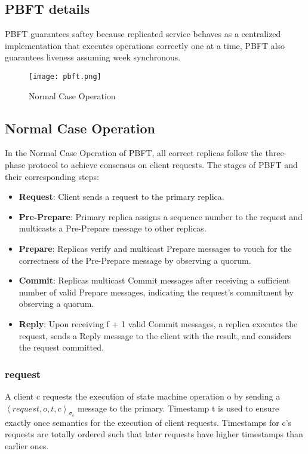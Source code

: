 \documentclass{article}
\begin{document}
\subsection{PBFT details}
PBFT guarantees saftey because replicated service behaves as a centralized implementation that executes operations correctly one at a time, PBFT also guarantees liveness assuming week synchronous.
\begin{figure}[t]
\texttt{[image: pbft.png]}
\centering
\caption{Normal Case Operation}
\end{figure}
\subsection{Normal Case Operation}
In the Normal Case Operation of PBFT, all correct replicas follow the three-phase protocol to achieve consensus on client requests.
The stages of PBFT and their corresponding steps:
\begin{itemize}
    \item \textbf{Request}: Client sends a request to the primary replica.
    \item \textbf{Pre-Prepare}: Primary replica assigns a sequence number to the request and multicasts a Pre-Prepare message to other replicas.
    \item \textbf{Prepare}: Replicas verify and multicast Prepare messages to vouch for the correctness of the Pre-Prepare message by observing a quorum.
    \item \textbf{Commit}: Replicas multicast Commit messages after receiving a sufficient number of valid Prepare messages, indicating the request's commitment by observing a quorum.
    \item \textbf{Reply}: Upon receiving f + 1 valid Commit messages, a replica executes the request, sends a Reply message to the client with the result, and considers the request committed.
\end{itemize}
\subsubsection{request}
A client c requests the execution of state machine operation o by sending a $ \left\langle request, o, t, c \right\rangle_{\sigma_c} $ message to the primary. Timestamp t is used to ensure exactly once semantics for the execution of client requests.
Timestamps for c’s requests are totally ordered such that
later requests have higher timestamps than earlier ones.
\end{document}
